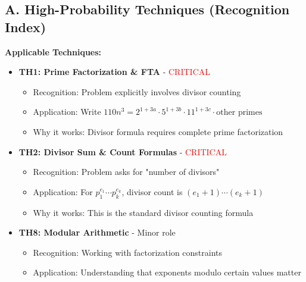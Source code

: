 \documentclass[]{article}
\begin{document}
\begin{techniquesbox}
\subsection*{A. High-Probability Techniques (Recognition Index)}

\textbf{Applicable Techniques:}
\begin{itemize}[leftmargin=*]
    \item \textbf{TH1: Prime Factorization \& FTA} - \textcolor{red}{CRITICAL}
    \begin{itemize}
        \item Recognition: Problem explicitly involves divisor counting
        \item Application: Write $110n^3 = 2^{1+3a} \cdot 5^{1+3b} \cdot 11^{1+3c} \cdot \text{other primes}$
        \item Why it works: Divisor formula requires complete prime factorization
    \end{itemize}
    
    \item \textbf{TH2: Divisor Sum \& Count Formulas} - \textcolor{red}{CRITICAL}
    \begin{itemize}
        \item Recognition: Problem asks for "number of divisors"
        \item Application: For $p_1^{e_1} \cdots p_k^{e_k}$, divisor count is $(e_1+1) \cdots (e_k+1)$
        \item Why it works: This is the standard divisor counting formula
    \end{itemize}
    
    \item \textbf{TH8: Modular Arithmetic} - Minor role
    \begin{itemize}
        \item Recognition: Working with factorization constraints
        \item Application: Understanding that exponents modulo certain values matter
    \end{itemize}
\end{itemize}


\end{techniquesbox}
\end{document}
